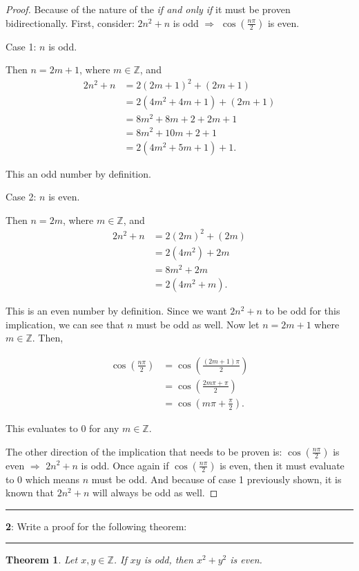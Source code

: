 \documentclass[11pt]{article}
\newtheorem{theorem}{Theorem}
\newcommand\question[2]{\vspace{.25in}\hrule\textbf{#1}: #2\vspace{.5em}\hrule\vspace{.10in}}
\newcommand{\Z}{\mathbb{Z}}
\begin{document}
\begin{proof}
	Because of the nature of the \textit{if and only if} it must be proven bidirectionally. First, consider: $2n^2+n$ is odd $\Rightarrow$ $\cos(\frac{n \pi}{2})$ is even.

	Case 1: $n$ is odd.

	Then $n=2m+1$, where $m \in \Z$, and
	\begin{align*}
		2n^2+n &= 2(2m+1)^2 + (2m+1)\\
		&= 2(4m^2+4m+1) + (2m+1)\\
		&= 8m^2+8m+2+2m+1\\
		&= 8m^2+10m+2+1\\
		&= 2(4m^2+5m+1) + 1.
	\end{align*}

	This an odd number by definition.

	Case 2: $n$ is even.

	Then $n=2m$, where $m \in \Z$, and
	\begin{align*}
		2n^2+n &= 2(2m)^2 + (2m)\\
		&= 2(4m^2)+2m\\
		&= 8m^2+2m\\
		&= 2(4m^2+m).
	\end{align*}

	This is an even number by definition. Since we want $2n^2+n$ to be odd for this implication, we can see that $n$ must be odd as well. Now let $n = 2m+1$ where $m \in \Z$. Then, 

	\begin{align*}
		\cos\left(\frac{n\pi}{2}\right) &= \cos\left(\frac{(2m+1)\pi}{2}\right)\\
		&= \cos\left(\frac{2m\pi + \pi}{2}\right)\\
		&= \cos\left(m\pi + \frac{\pi}{2}\right).
	\end{align*}

	This evaluates to 0 for any $m \in \Z$.

	The other direction of the implication that needs to be proven is: $\cos(\frac{n\pi}{2})$ is even $\Rightarrow$ $2n^2+n$ is odd. Once again if $\cos(\frac{n\pi}{2})$ is even, then it must evaluate to 0 which means $n$ must be odd. And because of case 1 previously shown, it is known that $2n^2+n$ will always be odd as well.
\end{proof}

\pagebreak 
\question{2}{Write a proof for the following theorem:}

\begin{theorem}
	Let $x,y \in \Z$. If $xy$ is odd, then $x^2 + y^2$ is even.
\end{theorem}
\end{document}
